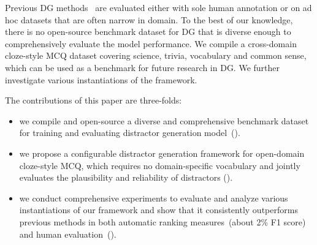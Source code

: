 
Previous DG methods~\cite{Kumar2015RevUP,liang2017distractor,liang2018distractor} are evaluated either with sole human annotation or on ad hoc datasets that are often narrow in domain.
To the best of our knowledge, there is no open-source benchmark dataset for DG that is diverse enough to comprehensively evaluate the model performance. We compile a cross-domain cloze-style MCQ dataset covering science, trivia, vocabulary and common sense, which can be used as a benchmark for future research in DG. We further
investigate various instantiations of the framework. 

The contributions of this paper are three-folds:
\begin{itemize}
	\setlength{\itemsep}{1pt}
	\setlength{\parsep}{1pt}
	\setlength{\parskip}{1pt}
	\item we compile and open-source a diverse and comprehensive benchmark dataset for training and evaluating distractor generation model~().
	\item we propose a configurable distractor generation framework for open-domain cloze-style MCQ, which requires no domain-specific vocabulary and jointly evaluates the plausibility and reliability of distractors ().
	\item we conduct comprehensive experiments to evaluate and analyze various instantiations of our framework and show that it consistently outperforms previous methods in both automatic ranking measures~(about 2\% F1 score) and human evaluation~().
\end{itemize}
